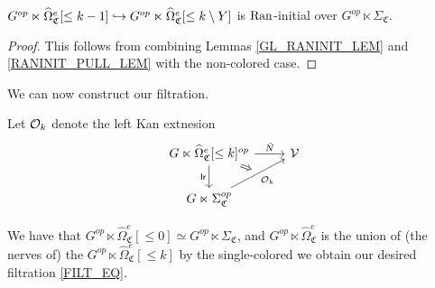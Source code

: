 \documentclass[a4paper,10pt
,draft
]{article}%
\renewcommand{\hat}{\widehat}
\renewcommand{\1}{\eta}%
\newcommand{\SC}{\Sigma_{\mathfrak C}}
\begin{document}
\begin{lemma}
      \label{LANINT_LEM}
      $G^{op} \ltimes \hat\Omega_{\mathfrak C}^e[\leq k-1] \into G^{op} \ltimes \hat\Omega_{\mathfrak C}^e[\leq k \setminus Y]$
      is $\operatorname{Ran}$-initial over $G^{op} \ltimes \SC$.
\end{lemma}
\begin{proof}
      This follows from combining Lemmas \ref{GL_RANINIT_LEM} and \ref{RANINIT_PULL_LEM} with the non-colored case.
\end{proof}

We can now construct our filtration.
\begin{definition}
      Let $\mathcal{O}_k$ denote the left Kan extnesion
      \begin{equation}
            \begin{tikzcd}
                  |[alias = A]| G \ltimes \hat\Omega_{\mathfrak C}^e[\leq k]^{op} \arrow[r, "\tilde N"] \arrow[d, "\mathsf{lr}"']
                  &
                  \V
                  \\
                  G \ltimes \SC^{op} \arrow[ur, "\O_k"', ""{name = B}]
                  \arrow[Rightarrow, from = A, to = B]
            \end{tikzcd}
      \end{equation}
\end{definition}

We have that $G^{op} \ltimes \hat\Omega_{\mathfrak C}^e[\leq 0] \simeq G^{op} \ltimes \SC$,
and $G^{op} \ltimes \hat\Omega_{\mathfrak C}^e$ is the union of (the nerves of) the $G^{op} \ltimes \hat\Omega_{\mathfrak C}^e[\leq k]$
by the single-colored
we obtain our desired filtration \eqref{FILT_EQ}.
\end{document}
